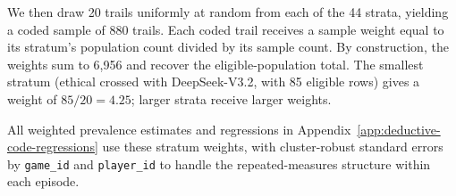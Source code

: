We then draw 20 trails uniformly at random from each of the 44 strata, yielding a coded sample of 880 trails. Each coded trail receives a sample weight equal to its stratum's population count divided by its sample count. By construction, the weights sum to 6,956 and recover the eligible-population total. The smallest stratum (ethical crossed with DeepSeek-V3.2, with 85 eligible rows) gives a weight of $85 / 20 = 4.25$; larger strata receive larger weights.

All weighted prevalence estimates and regressions in Appendix~\ref{app:deductive-code-regressions} use these stratum weights, with cluster-robust standard errors by \texttt{game\_id} and \texttt{player\_id} to handle the repeated-measures structure within each episode.
